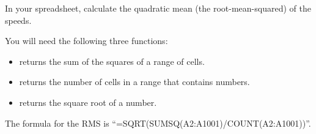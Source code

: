 \begin{Exercise}[title={RMS}, label=rms_spreadsheet]

  In your spreadsheet, calculate the quadratic mean (the root-mean-squared) of the speeds.

  You will need the following three functions:
  \begin{itemize}
  \item {} returns the sum of the squares of a range of cells.
  \item {} returns the number of cells in a range that contains numbers.
  \item {} returns the square root of a number.
  \end{itemize}


\end{Exercise}
\begin{Answer}[ref=rms_spreadsheet]

The formula for the RMS is ``=SQRT(SUMSQ(A2:A1001)/COUNT(A2:A1001))''.

\end{Answer}

